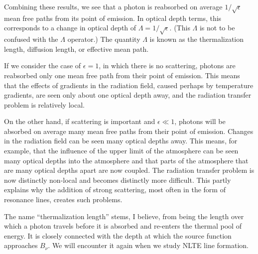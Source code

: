 Combining these results, we see that a photon is reabsorbed
on average $1/\sqrt\epsilon$ mean free paths from its point
of emission. In optical depth terms, this corresponds to a
change in optical depth of $\Lambda = 1/\sqrt\epsilon$.
(This $\Lambda$ is not to be confused with the $\Lambda$
operator.) The quantity $\Lambda$ is known as the
thermalization length, diffusion length, or effective mean
path.

If we consider the case of $\epsilon = 1$, in which there is
no scattering, photons are reabsorbed only one mean free
path from their point of emission. This means that the
effects of gradients in the radiation field, caused perhaps
by temperature gradients, are seen only about one optical
depth away, and the radiation transfer problem is relatively
local.

On the other hand, if scattering is important and $\epsilon
\ll 1$, photons will be absorbed on average many mean free
paths from their point of emission. Changes in the radiation
field can be seen many optical depths away. This means, for
example, that the influence of the upper limit of the
atmosphere can be seen many optical depths into the
atmosphere and that parts of the atmosphere that are many
optical depths apart are now coupled. The radiation transfer
problem is now distinctly non-local and becomes distinctly
more difficult. This partly explains why the addition of
strong scattering, most often in the form of resonance
lines, creates such problems.

The name ``thermalization length'' stems, I believe, from
being the length over which a photon travels before it is
absorbed and re-enters the thermal pool of energy. It is
closely connected with the depth at which the source
function approaches $B_\nu$. We will encounter it again when
we study NLTE line formation.

